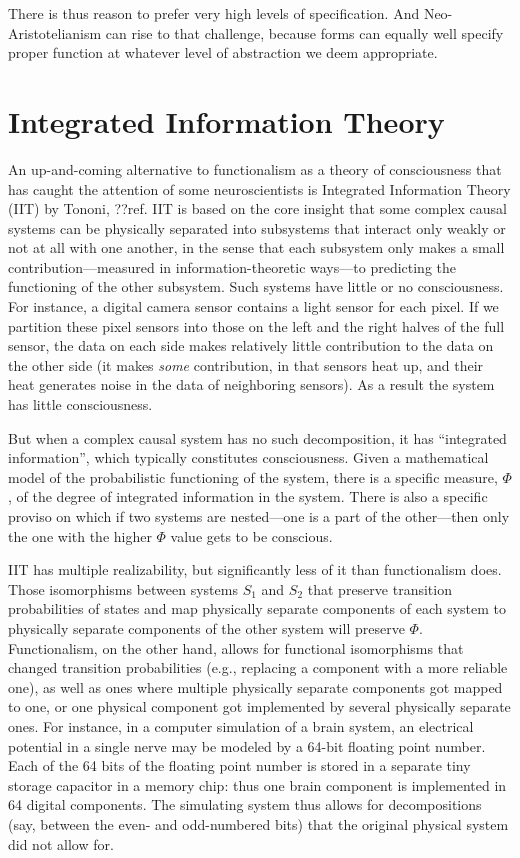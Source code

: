 There is thus reason to prefer very high levels of specification. And Neo-Aristotelianism can rise to that challenge, because 
forms can equally well specify proper function at whatever level of abstraction we deem appropriate. 

\section{Integrated Information Theory}
An up-and-coming alternative to functionalism as a theory of consciousness that has caught the attention of some 
neuroscientists is Integrated Information Theory (IIT) by Tononi, ??ref. IIT is based on the core insight that some complex causal systems 
can be physically separated into subsystems that interact only weakly or not at all with one another, in the sense that each 
subsystem only makes a small contribution---measured in information-theoretic ways---to predicting the functioning 
of the other subsystem. Such systems have little or no consciousness. For instance, a digital camera sensor contains a 
light sensor for each pixel. If we partition these pixel sensors into those on the left and the right halves of the 
full sensor, the data on each side makes relatively little contribution to the data on the other side (it makes \textit{some}
contribution, in that sensors heat up, and their heat generates noise in the data of neighboring
sensors). As a result the system has little consciousness.

But when a complex causal system has no such decomposition, it has ``integrated information'',
which typically constitutes consciousness. Given a mathematical model of the probabilistic functioning of the system, 
there is a specific measure, $\Phi$, of the degree of integrated information in the system. There is also a specific
proviso on which if two systems are nested---one is a part of the other---then only the one with the higher $\Phi$
value gets to be conscious. 

IIT has multiple realizability, but significantly less of it than functionalism does. Those isomorphisms 
between systems $S_1$ and $S_2$ that preserve transition probabilities of states and map physically separate 
components of each system to physically separate components of the other system will preserve $\Phi$. 
Functionalism, on the other hand, allows for functional isomorphisms that changed transition probabilities 
(e.g., replacing a component with a more reliable one), as well as ones where multiple physically separate 
components got mapped to one, or one physical component got implemented by several physically separate ones. 
For instance, in a computer simulation of a brain system, an electrical potential in a single nerve may be 
modeled by a 64-bit floating point number. Each of the 64 bits of the floating point number is stored in a
separate tiny storage capacitor in a memory chip: thus one brain component is implemented in 64 digital components.
The simulating system thus allows for decompositions (say, between the even- and odd-numbered bits) that the original
physical system did not allow for. 

